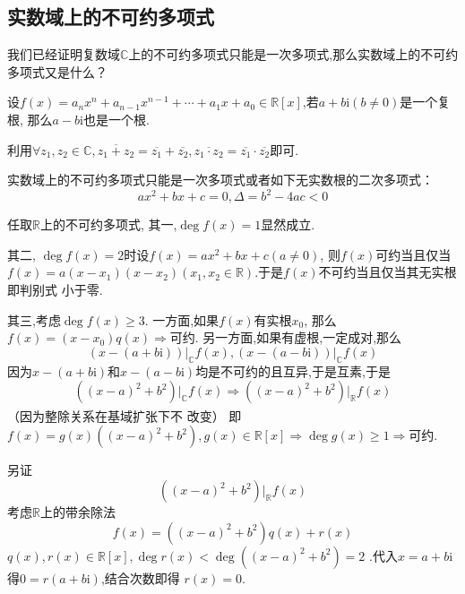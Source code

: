 \subsection{实数域上的不可约多项式}
我们已经证明复数域$\mathbb{C}$上的不可约多项式只能是一次多项式,那么实数域上的不可约多项式又是什么？
\begin{formal}
\begin{theorem}[根的成对]\label{thm:根的成对}
    设$f\left(x\right)=a_nx^n+a_{n-1}x^{n-1}+\cdots+a_1x+a_0\in\mathbb{R}\left[x\right]$,若$a+b\mathrm{i}\left(b\neq 0\right)$是一个复根,
    那么$a-b\mathrm{i}$也是一个根.
\end{theorem}
\begin{Proof}
利用$\forall z_1,z_2\in\mathbb{C},\overline{z_1+z_2}=\overline{z_1}+\overline{z_2},\overline{z_1\cdot z_2}=\overline{z_1}\cdot \overline{z_2}$即可.
\end{Proof}
\end{formal}
\begin{formal}
\begin{theorem}[实数域上的不可约多项式]\label{thm:实数域上的不可约多项式}
    实数域上的不可约多项式只能是一次多项式或者如下无实数根的二次多项式：
    \[
    ax^2+bx+c=0,\Delta = b^2-4ac<0
    \]
\end{theorem}
\begin{Proof}
任取$\mathbb{R}$上的不可约多项式,
其一,$\deg f\left(x\right)=1$显然成立.

其二,
$\deg f\left(x\right)=2$时设$f\left(x\right)=ax^2+bx+c\left(a\neq 0\right)$,
则$f\left(x\right)$可约当且仅当$f\left(x\right)=a\left(x-x_1\right)\left(x-x_2\right)
\left(x_1,x_2\in\mathbb{R}\right)$.于是$f\left(x\right)$不可约当且仅当其无实根即判别式
小于零.

其三,考虑$\deg f\left(x\right)\geqslant 3$.
一方面,如果$f\left(x\right)$有实根$x_0$,
那么$f\left(x\right)=\left(x-x_0\right)q\left(x\right)\Longrightarrow $可约.
另一方面,如果有虚根,一定成对,那么\[\left(
    x-\left(a+b\mathrm{i}\right)
\right)\big|_{\mathbb{C}}f\left(x\right),
\left(
    x-\left(a-b\mathrm{i}\right)
\right)\big|_{\mathbb{C}}f\left(x\right)
\]
因为$x-\left(a+b\mathrm{i}\right)$和$x-\left(a-
b\mathrm{i}\right)$均是不可约的且互异,于是互素,于是
\[
\left(\left(x-a\right)^2+b^2\right)\big|_{\mathbb{C}}f\left(x
\right)\Longrightarrow
\left(\left(x-a\right)^2+b^2\right)\big|_{\mathbb{R}}f\left(x\right)
\]
（因为整除关系在基域扩张下不
改变\textsuperscript{\cite{谢启鸿2015}}）
即$f\left(x\right)=g\left(x\right)\left(\left(x-a\right)^2+b^2\right),
g\left(x\right)\in\mathbb{R}\left[x\right]\Longrightarrow \deg g\left(x\right)\geqslant 1\Longrightarrow $可约.

另证\[
\left(\left(x-a\right)^2+b^2\right)\big|_{\mathbb{R}}f\left(x
\right)
\]
考虑$\mathbb{R}$上的带余除法
\[
f\left(x\right)=\left(\left(x-a\right)^2+b^2\right)q\left(x\right)+r\left(x\right)
\]
$q\left(x\right),r\left(x\right)\in\mathbb{R}\left[x\right],\deg r\left(x\right)<\deg \left(\left(x-a\right)^2+b^2\right)=2$
.代入$x=a+b\mathrm{i}$得$0=r\left(a+b\mathrm{i}\right)$,结合次数即得
$r\left(x\right)=0.$
\end{Proof}
\end{formal}

